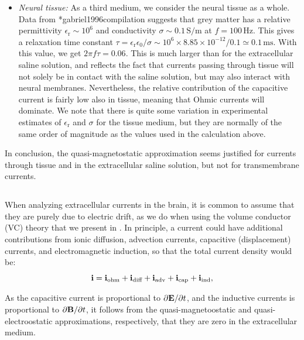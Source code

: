 \begin{itemize}
\item \textit{Neural tissue:} As a third medium, we consider the neural tissue as a whole. Data from \citeasnoun**{gabriel1996compilation} suggests that grey matter has a relative permittivity $\epsilon_\text{r} \sim 10^6$ and conductivity $\sigma \sim 0.1 \, \si{\siemens\per\metre}$ at $f = 100 \, \si{\hertz}$. This gives a relaxation time constant $\tau = \epsilon_\text{r} \epsilon_0/\sigma \sim 10^6\times 8.85\times10^{-12}/0.1 \simeq 0.1 \, \si{\milli\second}$. With this value, we get $2 \pi f \tau =  0.06$. This is much larger than for the extracellular saline solution, and reflects the fact that currents passing through tissue will not solely be in contact with the saline solution, but may also interact with neural membranes. Nevertheless, the relative contribution of the capacitive current is fairly low also in tissue, meaning that Ohmic currents will dominate. We note that there is quite some variation in experimental estimates of  $\epsilon_\text{r}$ and $\sigma$ for the tissue medium, but they are normally of the same order of magnitude as the values used in the calculation above.
\end{itemize}

In conclusion, the quasi-magnetostatic approximation seems justified for currents through tissue and in the extracellular saline solution, but not for transmembrane currents.


\subsection{}
\label{sec:Basics:onlyohmic}
When analyzing extracellular currents in the brain, it is common to assume that they are purely due to electric drift, as we do when using the volume conductor (VC) theory that we present in . In principle, a current could have additional contributions from ionic diffusion, advection currents, capacitive (displacement) currents, and electromagnetic induction, so that the total current density would be:
\begin{equation}
{\bf i} = {\bf i}_\text{ohm} + {\bf i}_\text{diff} + {\bf i}_\text{adv} + {\bf i}_\text{cap} + {\bf i}_\text{ind}, 
\label{VC:eq:generalcurrent}
\end{equation}

As the capacitive current is proportional to $\partial {\bf E}/\partial t$, and the inductive currents is proportional to $\partial {\bf B}/\partial t$, it follows from the quasi-magnetoostatic and quasi-electroostatic approximations, respectively, that they are zero in the extracellular medium. 

